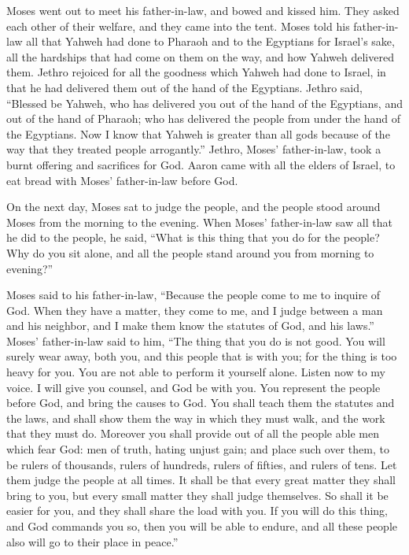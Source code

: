  Moses went out to meet his father-in-law, and bowed and
kissed him. They asked each other of their welfare, and they came into
the tent.  Moses told his father-in-law all that Yahweh had
done to Pharaoh and to the Egyptians for Israel's sake, all the
hardships that had come on them on the way, and how Yahweh delivered
them.  Jethro rejoiced for all the goodness which Yahweh had
done to Israel, in that he had delivered them out of the hand of the
Egyptians.  Jethro said, ``Blessed be Yahweh, who has
delivered you out of the hand of the Egyptians, and out of the hand of
Pharaoh; who has delivered the people from under the hand of the
Egyptians.  Now I know that Yahweh is greater than all gods
because of the way that they treated people arrogantly.'' 
Jethro, Moses' father-in-law, took a burnt offering and sacrifices for
God. Aaron came with all the elders of Israel, to eat bread with Moses'
father-in-law before God.

 On the next day, Moses sat to judge the people, and the
people stood around Moses from the morning to the evening. 
When Moses' father-in-law saw all that he did to the people, he said,
``What is this thing that you do for the people? Why do you sit alone,
and all the people stand around you from morning to evening?''

 Moses said to his father-in-law, ``Because the people come
to me to inquire of God.  When they have a matter, they
come to me, and I judge between a man and his neighbor, and I make them
know the statutes of God, and his laws.''  Moses'
father-in-law said to him, ``The thing that you do is not good.
 You will surely wear away, both you, and this people that
is with you; for the thing is too heavy for you. You are not able to
perform it yourself alone.  Listen now to my voice. I will
give you counsel, and God be with you. You represent the people before
God, and bring the causes to God.  You shall teach them the
statutes and the laws, and shall show them the way in which they must
walk, and the work that they must do.  Moreover you shall
provide out of all the people able men which fear God: men of truth,
hating unjust gain; and place such over them, to be rulers of thousands,
rulers of hundreds, rulers of fifties, and rulers of tens. 
Let them judge the people at all times. It shall be that every great
matter they shall bring to you, but every small matter they shall judge
themselves. So shall it be easier for you, and they shall share the load
with you.  If you will do this thing, and God commands you
so, then you will be able to endure, and all these people also will go
to their place in peace.''

